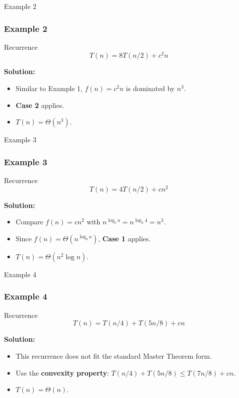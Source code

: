 
\begin{frame}{Example 2}
\frametitle{Example 2}
  \begin{block}{Recurrence}
\[
T(n) = 8T(n/2) + c^2n
\]
  \end{block}

\textbf{Solution:}
\begin{itemize}
    \item Similar to Example 1, \( f(n) = c^2n \) is dominated by \( n^3 \).
    \item \textbf{Case 2} applies.
    \item \( T(n) = \Theta(n^3) \).
\end{itemize}
\end{frame}


\begin{frame}{Example 3}
\frametitle{Example 3}
  \begin{block}{Recurrence}
\[
T(n) = 4T(n/2) + cn^2
\]
  \end{block}
\textbf{Solution:}
\begin{itemize}
    \item Compare \( f(n) = cn^2 \) with \( n^{\log_b a} = n^{\log_2 4} = n^2 \).
    \item Since \( f(n) = \Theta(n^{\log_b a}) \), \textbf{Case 1} applies.
    \item \( T(n) = \Theta(n^2 \log n) \).
\end{itemize}
\end{frame}


\begin{frame}{Example 4}
\frametitle{Example 4}
  \begin{block}{Recurrence}
\[
T(n) = T(n/4) + T(5n/8) + cn
\]
  \end{block}

\textbf{Solution:}
\begin{itemize}
    \item This recurrence does not fit the standard Master Theorem form.
    \item Use the \textbf{convexity property}: \( T(n/4) + T(5n/8) \leq T(7n/8) + cn \).
    \item \( T(n) = \Theta(n) \).
\end{itemize}
\end{frame}


